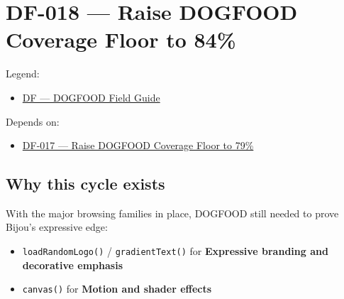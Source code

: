 \chapter{DF-018 --- Raise DOGFOOD Coverage Floor to 84\%}\label{record-080}

\smallskip

Legend:

\begin{itemize}
\tightlist
\item
  \href{https://github.com/flyingrobots/bijou/blob/1853ad902f6bf219326409e7f743a5a1d6517dbc/docs/legends/DF-dogfood-field-guide.md}{DF --- DOGFOOD Field Guide}
\end{itemize}

Depends on:

\begin{itemize}
\tightlist
\item
  \href{https://github.com/flyingrobots/bijou/blob/cbd70612140e7a450d764b3c7be1c6af878b99bc/docs/design/DF-017-raise-dogfood-coverage-floor-to-79-percent.md}{DF-017 --- Raise DOGFOOD Coverage Floor to 79\%}
\end{itemize}

\section{Why this cycle exists}\label{record-080-why-this-cycle-exists}

With the major browsing families in place, DOGFOOD still needed to prove Bijou's expressive edge:

\begin{itemize}
\tightlist
\item
  \texttt{l\allowbreak{}o\allowbreak{}a\allowbreak{}d\allowbreak{}R\allowbreak{}a\allowbreak{}n\allowbreak{}d\allowbreak{}o\allowbreak{}m\allowbreak{}L\allowbreak{}o\allowbreak{}g\allowbreak{}o\allowbreak{}(\allowbreak{})} / \texttt{g\allowbreak{}r\allowbreak{}a\allowbreak{}d\allowbreak{}i\allowbreak{}e\allowbreak{}n\allowbreak{}t\allowbreak{}T\allowbreak{}e\allowbreak{}x\allowbreak{}t\allowbreak{}(\allowbreak{})} for \textbf{Expressive branding and decorative emphasis}
\item
  \texttt{c\allowbreak{}a\allowbreak{}n\allowbreak{}v\allowbreak{}a\allowbreak{}s\allowbreak{}(\allowbreak{})} for \textbf{Motion and shader effects}
\end{itemize}

